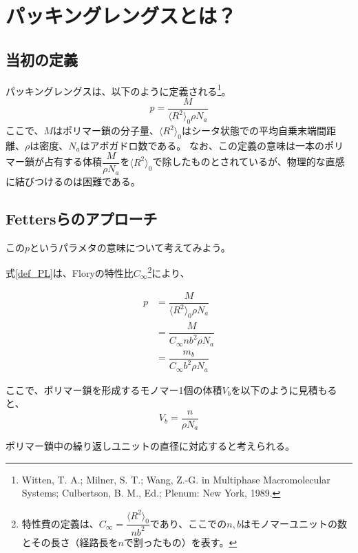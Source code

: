 \documentclass[a4paper,11pt]{ltjsarticle}
\begin{document}
\section{パッキングレングスとは？}

\subsection{当初の定義}

パッキングレングスは、以下のように定義される\footnote{
    Witten, T. A.; Milner, S. T.; Wang, Z.-G. in Multiphase Macromolecular Systems; Culbertson, B. M., Ed.; Plenum: New York, 1989.
}。
\begin{equation}
    p=\dfrac{M}{\langle R^2 \rangle_0 \rho N_a}
    \label{def_PL}
\end{equation}
ここで、$M$はポリマー鎖の分子量、$\langle R^2 \rangle_0$はシータ状態での平均自乗末端間距離、$\rho$は密度、$N_a$はアボガドロ数である。
なお、この定義の意味は一本のポリマー鎖が占有する体積$\dfrac{M}{\rho N_a}$を$\langle R^2 \rangle_0$で除したものとされているが、物理的な直感に結びつけるのは困難である。

\subsection{Fettersらのアプローチ}
この$p$というパラメタの意味について考えてみよう。

式\eqref{def_PL}は、Floryの特性比$C_{\infty}$\footnote{
特性費の定義は、$C_{\infty}=\dfrac{\langle R^2 \rangle_0}{n b^2}$であり、ここでの$n, b$はモノマーユニットの数とその長さ（経路長を$n$で割ったもの）を表す。
}により、

\begin{align}
    p&=\dfrac{M}{\langle R^2 \rangle_0 \rho N_a} \\
    &=\dfrac{M}{C_{\infty} n b^2 \rho N_a} \\
    &=\dfrac{m_b}{C_{\infty}b^2\rho N_a}
\end{align}

ここで、ポリマー鎖を形成するモノマー1個の体積$V_b$を以下のように見積もると、
\begin{equation}
    V_b=\dfrac{n}{\rho N_a}
\end{equation}







ポリマー鎖中の繰り返しユニットの直径に対応すると考えられる。
\end{document}
